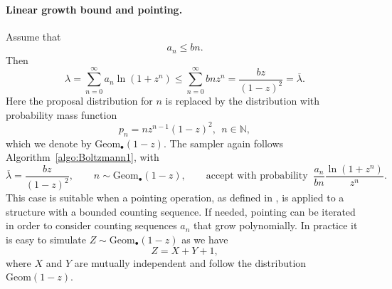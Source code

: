\documentclass[a4paper,10pt]{article}
\theoremstyle{definition}
\newcommand{\NN}{\mathbb{N}}
\begin{document}
\paragraph{Linear growth bound and pointing.}
Assume that
\begin{equation*}
    a_n \leq bn.
\end{equation*}
Then
\begin{equation*}
    \lambda = \sum_{n=0}^\infty a_n\ln(1+z^n) \leq \sum_{n=0}^\infty bn z^n = \frac{bz}{(1-z)^2} = \overline{\lambda}.
\end{equation*}
Here the proposal distribution for $n$ is replaced by the distribution with probability mass function
\begin{equation*}
    p_n = nz^{n-1}(1-z)^2, ~~n\in \NN,
\end{equation*}
which we denote by $\mathrm{Geom}_\bullet(1-z)$. The sampler again follows Algorithm~\ref{algo:Boltzmann1}, with
\begin{equation*}
    \overline{\lambda}=\frac{bz}{(1-z)^2},\qquad n\sim \mathrm{Geom}_\bullet(1-z),\qquad \text{accept with probability }\ \frac{a_n}{bn}\frac{\ln(1+z^n)}{z^n}.
\end{equation*}
This case is suitable when a pointing operation, as defined in \cite{anacomb}, is applied to a structure with a bounded counting sequence. If needed, pointing can be iterated in order to consider counting sequences $a_n$ that grow polynomially. In practice it is easy to simulate $Z\sim\mathrm{Geom}_\bullet(1-z)$ as we have
\begin{equation*}
    Z = X+Y+1,
\end{equation*}
where $X$ and $Y$ are mutually independent and follow the distribution $\mathrm{Geom}(1-z)$.
\end{document}
